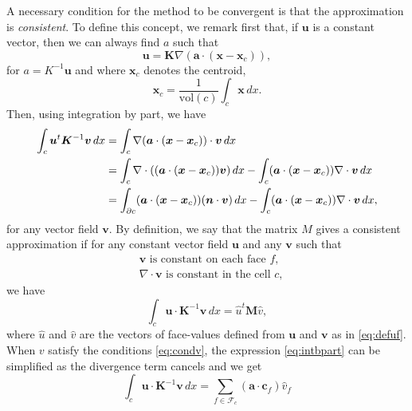 \documentclass[11pt]{amsart}
\newcommand{\vect}[1]{\boldsymbol{#1}}
\newcommand{\mat}[1]{\boldsymbol{#1}}
\newcommand{\grad}{\nabla}
\newcommand{\dive}{\nabla\cdot}
\newcommand{\Fcal}{\mathcal{F}}
\begin{document}
A necessary condition for the method to be convergent is that the approximation is
\emph{consistent}. To define this concept, we remark first that, if $\vect{u}$ is a constant vector,
then we can always find $a$ such that
\begin{equation}
  \label{eq:formu}
  \vect{u} = \mat{K}\grad(\vect{a}\cdot(\vect{x} - \vect{x}_c)),
\end{equation}
for $a=K^{-1}\vect{u}$ and where $\vect{x}_c$ denotes the centroid,
\begin{equation}
  \label{eq:defcentroid}
  \vect{x}_c = \frac{1}{\text{vol}(c)}\int_c \vect{x}\,dx.
\end{equation}
Then, using integration by part, we have
\begin{align}
  \label{eq:intbpart}
  \int_c\vect{u}^t\mat{K}^{-1}\vect{v}\,dx &=  \int_c\grad(\vect{a}\cdot(\vect{x} - \vect{x}_c))\cdot\vect{v}\,dx\\
  \notag                                           &= \int_c\dive((\vect{a}\cdot(\vect{x} - \vect{x}_c))\vect{v})\,dx - \int_c(\vect{a}\cdot(\vect{x} - \vect{x}_c))\dive\vect{v}\,dx\\
  \notag                                           &= \int_{\partial c}(\vect{a}\cdot(\vect{x} - \vect{x}_c))(\vect{n}\cdot\vect{v})\,dx - \int_c(\vect{a}\cdot(\vect{x} - \vect{x}_c))\dive\vect{v}\,dx,
\end{align}
for any vector field $\vect{v}$. By definition, we say that the matrix $M$ gives a consistent
approximation if for any constant vector field $\vect{u}$ and any $\vect{v}$ such that
\begin{subequations}
  \label{eq:condv}
  \begin{align}
&\vect{v} \text{ is constant on each face } f,  \\
&\dive{\vect{v}} \text{ is constant in the cell } c,
  \end{align}
\end{subequations}
we have
\begin{equation}
  \label{eq:consrel}
  \int_c\vect{u}\cdot\mat{K}^{-1}\vect{v}\,dx = \hat{u}^t\mat{M}\hat{v},
\end{equation}
where $\hat{u}$ and $\hat{v}$ are the vectors of face-values defined from $\vect{u}$ and $\vect{v}$
as in \eqref{eq:defuf}. When $v$ satisfy the conditions \eqref{eq:condv}, the expression
\eqref{eq:intbpart} can be simplified as the divergence term cancels and we get
\begin{equation}
 \label{eq:intbpart2}
 \int_c\vect{u}\cdot\mat{K}^{-1}\vect{v}\,dx  = \sum_{f\in\Fcal_c}(\vect{a}\cdot \vect{c}_f)\hat{v}_f
\end{equation}
\end{document}
